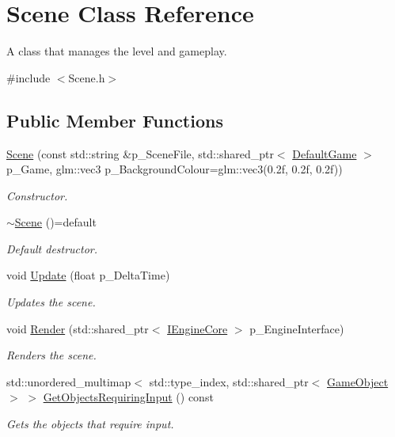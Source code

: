 \hypertarget{class_scene}{}\section{Scene Class Reference}
\label{class_scene}


A class that manages the level and gameplay.  




{\ttfamily \#include $<$Scene.\+h$>$}

\subsection*{Public Member Functions}
\begin{DoxyCompactItemize}
\item 
\mbox{\hyperlink{class_scene_af79734f17482face8f8295560eea537b}{Scene}} (const std\+::string \&p\+\_\+\+Scene\+File, std\+::shared\+\_\+ptr$<$ \mbox{\hyperlink{class_default_game}{Default\+Game}} $>$ p\+\_\+\+Game, glm\+::vec3 p\+\_\+\+Background\+Colour=glm\+::vec3(0.\+2f, 0.\+2f, 0.\+2f))
\begin{DoxyCompactList}\small\item\em Constructor. \end{DoxyCompactList}\item 
\mbox{\label{class_scene_a631eef7493cafce5d74739a2cad12a58}} 
\mbox{\hyperlink{class_scene_a631eef7493cafce5d74739a2cad12a58}{$\sim$\+Scene}} ()=default
\begin{DoxyCompactList}\small\item\em Default destructor. \end{DoxyCompactList}\item 
void \mbox{\hyperlink{class_scene_a5783e29cf26164a26149d129242a42b6}{Update}} (float p\+\_\+\+Delta\+Time)
\begin{DoxyCompactList}\small\item\em Updates the scene. \end{DoxyCompactList}\item 
void \mbox{\hyperlink{class_scene_a5e11c2fe829f4a4143f5edfa71619aa7}{Render}} (std\+::shared\+\_\+ptr$<$ \mbox{\hyperlink{class_i_engine_core}{I\+Engine\+Core}} $>$ p\+\_\+\+Engine\+Interface)
\begin{DoxyCompactList}\small\item\em Renders the scene. \end{DoxyCompactList}\item 
std\+::unordered\+\_\+multimap$<$ std\+::type\+\_\+index, std\+::shared\+\_\+ptr$<$ \mbox{\hyperlink{class_game_object}{Game\+Object}} $>$ $>$ \mbox{\hyperlink{class_scene_af479157ca173079d98fe5a392af06d24}{Get\+Objects\+Requiring\+Input}} () const
\begin{DoxyCompactList}\small\item\em Gets the objects that require input. \end{DoxyCompactList}\end{DoxyCompactItemize}


